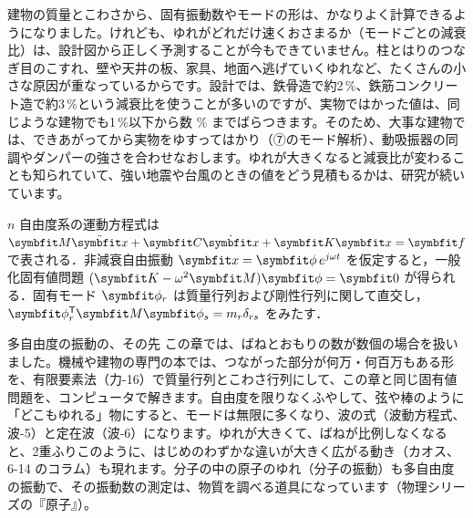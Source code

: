 \begin{phmada}
建物の質量とこわさから、固有振動数やモードの形は、かなりよく計算できるようになりました。けれども、ゆれがどれだけ速くおさまるか（モードごとの減衰比）は、設計図から正しく予測することが今もできていません。柱とはりのつなぎ目のこすれ、壁や天井の板、家具、地面へ逃げていくゆれなど、たくさんの小さな原因が重なっているからです。設計では、鉄骨造で約2\,\%、鉄筋コンクリート造で約3\,\%という減衰比を使うことが多いのですが、実物ではかった値は、同じような建物でも1\,\%以下から数 \% までばらつきます。そのため、大事な建物では、できあがってから実物をゆすってはかり（⑦のモード解析）、動吸振器の同調やダンパーの強さを合わせなおします。ゆれが大きくなると減衰比が変わることも知られていて、強い地震や台風のときの値をどう見積もるかは、研究が続いています。
\end{phmada}

\begin{senmonsho}[振動学の専門書の書き方]
\begin{bkhonbun}
$n$ 自由度系の運動方程式は $\symbfit M\ddot{\symbfit x}+\symbfit C\dot{\symbfit x}+\symbfit K\symbfit x=\symbfit f$ で表される．非減衰自由振動 $\symbfit x=\symbfit\phi\,e^{j\omega t}$ を仮定すると，一般化固有値問題 $(\symbfit K-\omega^2\symbfit M)\symbfit\phi=\symbfit 0$ が得られる．固有モード $\symbfit\phi_r$ は質量行列および剛性行列に関して直交し，$\symbfit\phi_r^{\mathsf T}\symbfit M\symbfit\phi_s=m_r\delta_{rs}$ をみたす．
\end{bkhonbun}
\end{senmonsho}

\begin{phsaki}{多自由度の振動の、その先}
この章では、ばねとおもりの数が数個の場合を扱いました。機械や建物の専門の本では、つながった部分が何万・何百万もある形を、有限要素法（力-16）で質量行列とこわさ行列にして、この章と同じ固有値問題を、コンピュータで解きます。自由度を限りなくふやして、弦や棒のように「どこもゆれる」物にすると、モードは無限に多くなり、波の式（波動方程式、波-5）と定在波（波-6）になります。ゆれが大きくて、ばねが比例しなくなると、2重ふりこのように、はじめのわずかな違いが大きく広がる動き（カオス、6-14 のコラム）も現れます。分子の中の原子のゆれ（分子の振動）も多自由度の振動で、その振動数の測定は、物質を調べる道具になっています（物理シリーズの『原子』）。
\end{phsaki}

